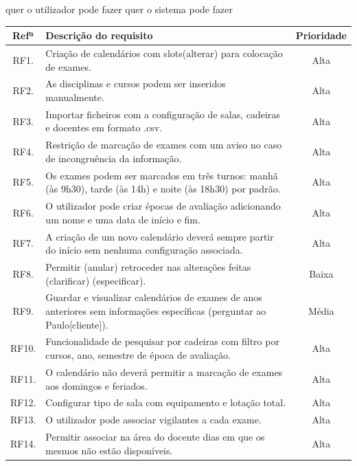 \documentclass[11pt, twoside]{report}
\begin{document}
	quer o utilizador pode fazer quer o sistema pode fazer
\begin{table}
	
	\begin{center}
		
				\begin{tabularx}{\textwidth}{|c|X|c|}
				\hline
				\textbf{Refª }	& \textbf{Descrição do requisito} & \textbf{Prioridade} \\
				\hline
				RF1. & Criação de calendários com slots(alterar) para colocação de exames. & Alta \\
				\hline
				RF2. & As disciplinas e cursos podem ser inseridos manualmente. & Alta\\
				\hline
				RF3. & Importar ficheiros com a configuração de salas, cadeiras e docentes em formato .csv. & Alta \\
				\hline
				RF4. &  Restrição de marcação de exames com um aviso no caso de incongruência da informação. & Alta \\
				\hline
				RF5. & Os exames podem ser marcados em três turnos: manhã (às 9h30), tarde (às 14h) e noite (às 18h30) por padrão. & Alta \\
				\hline
				RF6. & O utilizador pode criar épocas de avaliação adicionando um nome e uma data de início e fim. & Alta \\
				\hline
				RF7. & A criação de um novo calendário deverá sempre partir do início sem nenhuma configuração associada. & Alta\\
				\hline
				RF8. & Permitir (anular) retroceder nas alterações feitas (clarificar) (especificar). & Baixa \\
				\hline
				RF9. & Guardar e visualizar calendários de exames de anos anteriores sem informações específicas (perguntar ao Paulo[cliente]). & Média \\
				\hline
				RF10.  & Funcionalidade de pesquisar por cadeiras com filtro por cursos, ano, semestre de época de avaliação.  & Alta \\
				\hline
				RF11. & O calendário não deverá permitir a marcação de exames aos domingos e feriados. & Alta \\
				\hline
				RF12. & Configurar tipo de sala com equipamento e lotação total. & Alta \\
				\hline
				RF13. & O utilizador pode associar vigilantes a cada exame. & Alta \\
				\hline
				RF14. & Permitir associar na área do docente dias em que os mesmos não estão disponíveis. & Alta\\

\end{tabularx}
\end{center}
\end{table}
\end{document}
